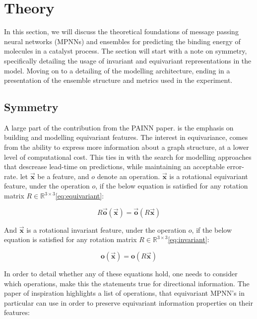 \section{Theory}\label{sec:theory}

In this section, we will discuss the theoretical foundations of message passing neural networks (MPNNs) and ensembles for predicting
the binding energy of molecules in a catalyst process. The section will start with a note on symmetry, specifically detailing the
usage of invariant and equivariant representations in the model. Moving on to a detailing of the modelling architecture, ending in a
presentation of the ensemble structure and metrics used in the experiment.

\subsection{Symmetry}\label{sec:symmetry}
A large part of the contribution from the PAINN paper\cite{PAINN}. is the emphasis on building and modelling equivariant features.
The interest in equivariance, comes from the ability to express more information about a graph structure, at a lower level of
computational cost. This ties in with the search for modelling approaches that descrease lead-time on predictions, while maintaining an
acceptable error-rate.
let $\vec{\mathbf{x}}$ be a feature, and $o$ denote an operation.
$\vec{\mathbf{x}}$ is a rotational equivariant feature, under the operation $o$,
if the below equation is satisfied for any rotation matrix $R \in \mathbb{R}^{3 \times 3}$\ref{eq:equivariant}:

\begin{equation}\label{eq:equivariant}
    R \vec{\mathbf{o}}(\vec{\mathbf{x}}) = \vec{\mathbf{o}}(R \vec{\mathbf{x}})
\end{equation}

And $\vec{\mathbf{x}}$ is a rotational invariant feature, under the operation $o$,
if the below equation is satisfied for any rotation matrix $R \in \mathbb{R}^{3 \times 3}$\ref{eq:invariant}:

\begin{equation}\label{eq:invariant}
    \mathbf{o}(\vec{\mathbf{x}}) = \mathbf{o}(R \vec{\mathbf{x}})
\end{equation}

In order to detail whether any of these equations hold, one needs to consider which operations, make this the statements true for
directional information. The paper of inspiration \cite{PAINN} highlights a list of operations,
that equivariant MPNN's in particular can use in order to preserve equivariant information properties on their features:

